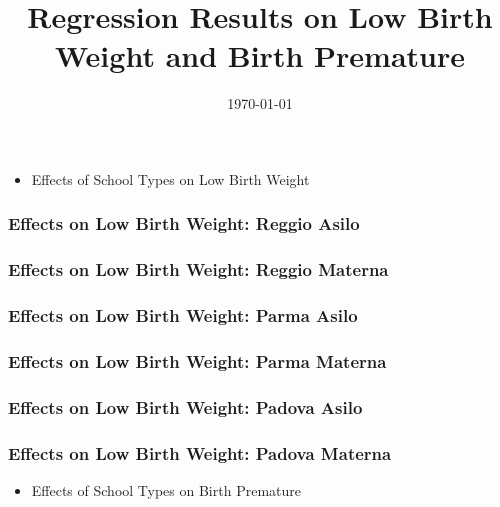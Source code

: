 \documentclass{beamer}
\title{Regression Results on Low Birth Weight and Birth Premature}
\date{\today}
\begin{document}
\begin{frame}
	\titlepage
\end{frame}


\begin{frame}
\begin{itemize}
	\centering
	\item Effects of School Types on Low Birth Weight
\end{itemize}
\end{frame}



\begin{frame}
\frametitle{Effects on Low Birth Weight: Reggio Asilo}
\centering
\footnotesize
\end{frame}

\begin{frame}
\frametitle{Effects on Low Birth Weight: Reggio Materna}
\centering
\footnotesize
\end{frame}

\begin{frame}
\frametitle{Effects on Low Birth Weight: Parma Asilo}
\centering
\footnotesize
\end{frame}

\begin{frame}
\frametitle{Effects on Low Birth Weight: Parma Materna}
\centering
\footnotesize
\end{frame}

\begin{frame}
\frametitle{Effects on Low Birth Weight: Padova Asilo}
\centering
\footnotesize
\end{frame}

\begin{frame}
\frametitle{Effects on Low Birth Weight: Padova Materna}
\centering
\footnotesize
\end{frame}

\begin{frame}
\begin{itemize}
	\centering
	\item Effects of School Types on Birth Premature
\end{itemize}
\end{frame}
\end{document}
